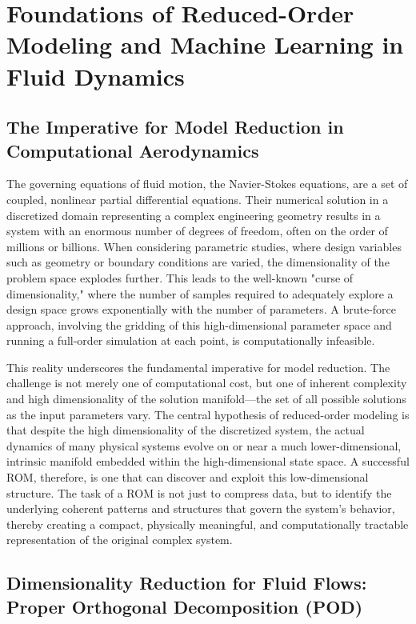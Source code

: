 \chapter{Foundations of Reduced-Order Modeling and Machine Learning in Fluid Dynamics}
\label{chap:lit_review}

\section{ The Imperative for Model Reduction in Computational Aerodynamics}

The governing equations of fluid motion, the Navier-Stokes equations, are a set of coupled, nonlinear partial differential equations. Their numerical solution in a discretized domain representing a complex engineering geometry results in a system with an enormous number of degrees of freedom, often on the order of millions or billions. When considering parametric studies, where design variables such as geometry or boundary conditions are varied, the dimensionality of the problem space explodes further. This leads to the well-known "curse of dimensionality," where the number of samples required to adequately explore a design space grows exponentially with the number of parameters. A brute-force approach, involving the gridding of this high-dimensional parameter space and running a full-order simulation at each point, is computationally infeasible.

This reality underscores the fundamental imperative for model reduction. The challenge is not merely one of computational cost, but one of inherent complexity and high dimensionality of the solution manifold—the set of all possible solutions as the input parameters vary. The central hypothesis of reduced-order modeling is that despite the high dimensionality of the discretized system, the actual dynamics of many physical systems evolve on or near a much lower-dimensional, intrinsic manifold embedded within the high-dimensional state space. A successful ROM, therefore, is one that can discover and exploit this low-dimensional structure. The task of a ROM is not just to compress data, but to identify the underlying coherent patterns and structures that govern the system's behavior, thereby creating a compact, physically meaningful, and computationally tractable representation of the original complex system.

\section{Dimensionality Reduction for Fluid Flows: Proper Orthogonal Decomposition (POD)}

